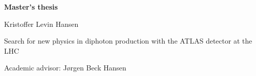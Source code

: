 \begin{titlingpage}
{\newlength{\markbump}\setlength{\markbump}{.3\paperwidth}\addtolength{\markbump}{-6mm}
\newlength{\markdown}\setlength{\markdown}{-75mm}\addtolength{\markdown}{0em}\addtolength{\markdown}{\paperheight}\addtolength{\markdown}{.15\paperwidth}
\noindent{}\makebox[0pt][r]{\raisebox{3.2mm}[0pt][0pt]{\textcolor{natgreen}{\rule{.06\paperwidth}{.7pt}}}}\makebox[0pt][l]{\raisebox{3.2mm}[0pt][0pt]{\textcolor{natgreen}{\rule{.95\paperwidth}{.7pt}}}}





\bigskip

{\sffamily
\begin{hangparas}{0em}{0}
{\textbf{ }

\vspace{2em}}

{\LARGE \textbf{Master's thesis}

\vspace{.3em}}

{\Large Kristoffer Levin Hansen}

\vspace{3em}

{\Huge \raggedright
Search for new physics in diphoton production with the ATLAS detector at the LHC
}
\vfill{}

{\Large Academic advisor: Jørgen Beck Hansen}
\vspace{28em}


\end{hangparas}}}
\end{titlingpage}
